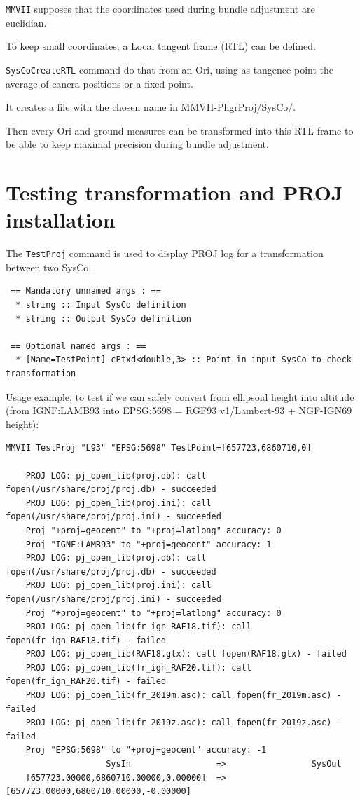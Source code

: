 {\tt MMVII} supposes that the coordinates used during bundle adjustment are euclidian.

To keep small coordinates, a Local tangent frame (RTL) can be defined.

{\tt SysCoCreateRTL} command do that from an Ori, using as tangence point the average of canera positions or a fixed point.

It creates a file with the chosen name in {MMVII-PhgrProj/SysCo/}.

Then every Ori and ground measures can be transformed into this RTL frame to be able to keep maximal precision during bundle adjustment.


\section{Testing transformation and PROJ installation}
The {\tt TestProj} command is used to display PROJ log for a transformation between two SysCo.

\begin{verbatim}
 == Mandatory unnamed args : ==
  * string :: Input SysCo definition
  * string :: Output SysCo definition

 == Optional named args : ==
  * [Name=TestPoint] cPtxd<double,3> :: Point in input SysCo to check transformation
\end{verbatim}

Usage example, to test if we can safely convert from ellipsoid height into altitude
(from IGNF:LAMB93 into EPSG:5698 = RGF93 v1/Lambert-93 + NGF-IGN69 height):

\begin{verbatim}
MMVII TestProj "L93" "EPSG:5698" TestPoint=[657723,6860710,0]

    PROJ LOG: pj_open_lib(proj.db): call fopen(/usr/share/proj/proj.db) - succeeded
    PROJ LOG: pj_open_lib(proj.ini): call fopen(/usr/share/proj/proj.ini) - succeeded
    Proj "+proj=geocent" to "+proj=latlong" accuracy: 0
    Proj "IGNF:LAMB93" to "+proj=geocent" accuracy: 1
    PROJ LOG: pj_open_lib(proj.db): call fopen(/usr/share/proj/proj.db) - succeeded
    PROJ LOG: pj_open_lib(proj.ini): call fopen(/usr/share/proj/proj.ini) - succeeded
    Proj "+proj=geocent" to "+proj=latlong" accuracy: 0
    PROJ LOG: pj_open_lib(fr_ign_RAF18.tif): call fopen(fr_ign_RAF18.tif) - failed
    PROJ LOG: pj_open_lib(RAF18.gtx): call fopen(RAF18.gtx) - failed
    PROJ LOG: pj_open_lib(fr_ign_RAF20.tif): call fopen(fr_ign_RAF20.tif) - failed
    PROJ LOG: pj_open_lib(fr_2019m.asc): call fopen(fr_2019m.asc) - failed
    PROJ LOG: pj_open_lib(fr_2019z.asc): call fopen(fr_2019z.asc) - failed
    Proj "EPSG:5698" to "+proj=geocent" accuracy: -1
                    SysIn                 =>                 SysOut                
    [657723.00000,6860710.00000,0.00000]  =>  [657723.00000,6860710.00000,-0.00000]
\end{verbatim}

